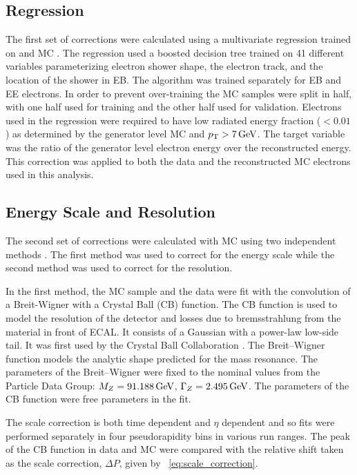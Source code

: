 \subsection{Regression}

The first set of corrections were calculated using a multivariate regression
trained on \Ztoee and \higgstoZZ MC \cite{cms_an_2012-327}. The regression used
a boosted decision tree trained on 41 different variables parameterizing
electron shower shape, the electron track, and the location of the shower in
EB. The algorithm was trained separately for EB and EE electrons. In order to
prevent over-training the MC samples were split in half, with one half used for
training and the other half used for validation. Electrons used in the
regression were required to have low radiated energy fraction ($< 0.01$) as
determined by the generator level MC and $p_{\mathrm{T}} > 7 \,\text{Ge\hspace{-.08em}V}$. The target variable
was the ratio of the generator level \bare electron energy over the
reconstructed energy. This correction was applied to both the data and the
reconstructed MC electrons used in this analysis.

\subsection{Energy Scale and Resolution}

The second set of corrections were calculated with \Ztoee MC using two
independent methods \cite{cms_an_2013-253}. The first method was used to
correct for the energy scale while the second method was used to correct for
the resolution.

In the first method, the MC sample and the data were fit with the convolution
of a Breit-Wigner with a Crystal Ball (CB) function. The CB function is used to
model the resolution of the detector and losses due to bremsstrahlung from the
material in front of ECAL. It consists of a Gaussian with a power-law low-side
tail. It was first used by the Crystal Ball Collaboration \cite{oreglia_1980}.
The Breit--Wigner function models the analytic shape predicted for the \Z mass
resonance. The parameters of the Breit--Wigner were fixed to the nominal values
from the Particle Data Group: $M_{Z} = 91.188 \,\text{Ge\hspace{-.08em}V}$, $\Gamma_{Z} = 2.495 \,\text{Ge\hspace{-.08em}V}$. The
parameters of the CB function were free parameters in the fit.

The scale correction is both time dependent and $\eta$ dependent and so fits
were performed separately in four pseudorapidity bins in various run ranges.
The peak of the CB function in data and MC were compared with the relative
shift taken as the scale correction, $\Delta P$, given by
\EQ~\ref{eq:scale_correction}.


